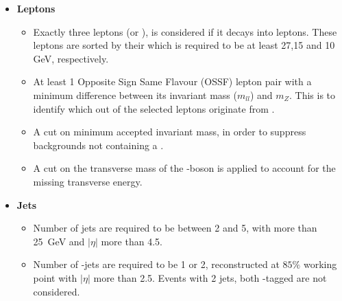 \begin{itemize}
  \item \textbf{Leptons}
    \begin{itemize}
      \item Exactly three leptons (\Pelectron or \Pmu), 
      \Ptau is considered if it decays into leptons. These leptons are 
      sorted by their \pT which is required to be at least 27,15 and 10 GeV, respectively.
      
      \item At least 1 Opposite Sign Same Flavour (OSSF) lepton pair with a minimum
      difference between its invariant mass ($m_{ll}$) and $m_Z$. This is to identify 
      which out of the selected leptons originate from \PZ.

      \item A cut on minimum accepted invariant mass, in order to suppress backgrounds 
      not containing a \PZ.

      \item A cut on the transverse mass of the \PW-boson is applied to account for the missing
      transverse energy. 
  \end{itemize}
  \item \textbf{Jets}
  \begin{itemize}
    \item Number of jets are required to be between 2 and 5, with \pT more than \qty{25}{GeV}
    and $|\eta|$ more than 4.5.
    \item Number of \Pbottom-jets are required to be 1 or 2, reconstructed at $85\%$ working 
    point with $|\eta|$ more than 2.5. Events with 2 jets, both \Pbottom-tagged are not considered.
  \end{itemize}


\end{itemize}

